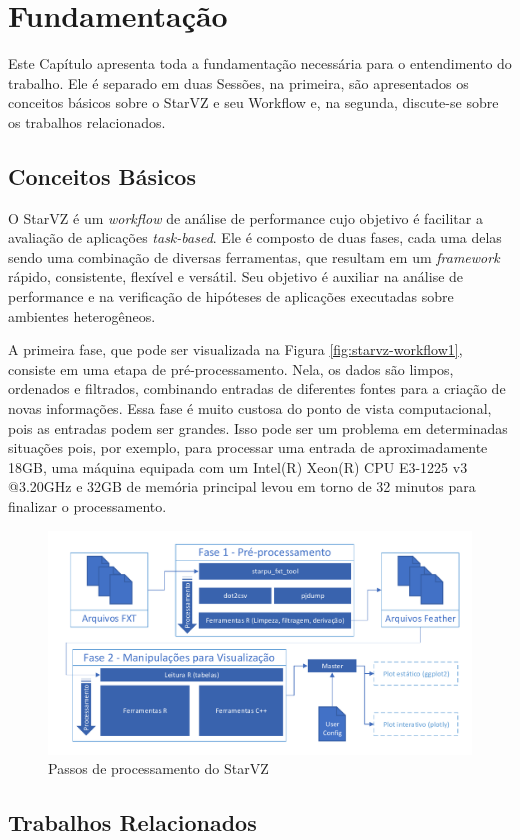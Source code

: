 \chapter{Fundamentação} \label{ch:fundamentation}

Este Capítulo apresenta toda a fundamentação necessária para o entendimento do trabalho. 
Ele é separado em duas Sessões, na primeira, são apresentados os conceitos básicos sobre 
o StarVZ e seu Workflow e, na segunda, discute-se sobre os trabalhos relacionados.

\section{Conceitos Básicos} \label{sect:basic-concepts}

O StarVZ \cite{ref:starvz} é um \emph{workflow} de análise de performance cujo objetivo é facilitar
a avaliação de aplicações \emph{task-based}. Ele é composto de duas fases, cada uma delas sendo uma 
combinação de diversas ferramentas, que resultam em um \emph{framework} rápido, consistente, flexível 
e versátil. Seu objetivo é auxiliar na análise de performance e na verificação de hipóteses de aplicações 
executadas sobre ambientes heterogêneos.

A primeira fase, que pode ser visualizada na Figura \ref{fig:starvz-workflow1}, consiste em uma etapa de pré-processamento.
Nela, os dados são limpos, ordenados e filtrados, combinando entradas de diferentes fontes para a criação de novas informações.
Essa fase é muito custosa do ponto de vista computacional, pois as entradas podem ser grandes. Isso pode ser um problema em 
determinadas situações pois, por exemplo, para processar uma entrada de aproximadamente 18GB, uma máquina equipada com um Intel(R)
Xeon(R) CPU E3-1225 v3 @3.20GHz e 32GB de memória principal levou em torno de 32 minutos para finalizar o processamento.

\begin{figure}[H]
 \centerline{\includegraphics[width=1\textwidth]{../img/all-proc.pdf}}
 \caption{Passos de processamento do StarVZ}
 \label{fig:starvz-steps}
\end{figure}

\section{Trabalhos Relacionados}\label{sect:related-work}